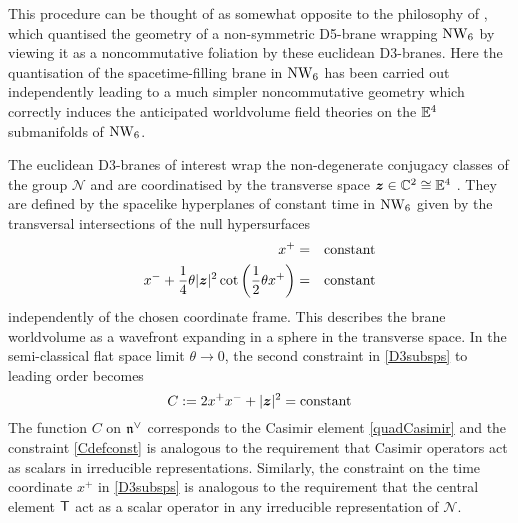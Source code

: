 This procedure can be thought of as somewhat opposite to the philosophy of
\cite{Halliday:2005zt}, which quantised the geometry of a non-symmetric D5-brane
wrapping $\operatorname{NW}_6$ \cite{KNSanjay1} by viewing it as a noncommutative foliation by
these euclidean D3-branes. Here the quantisation of the spacetime-filling brane
in $\operatorname{NW}_6$ has been carried out independently leading to a much simpler
noncommutative geometry which correctly induces the anticipated worldvolume
field theories on the ${\mathbb E}^4$ submanifolds of $\operatorname{NW}_6$.

The euclidean D3-branes of interest wrap the non-degenerate conjugacy classes of
the group $\mathcal{N}$ and are coordinatised by the transverse space
${{\boldsymbol {z} }}\in{\mathbb C}^2\cong{\mathbb E}^4$ \cite{SF1}. They are defined by the spacelike
hyperplanes of constant time in $\operatorname{NW}_6$ given by the transversal intersections
of the null hypersurfaces
\begin{eqnarray}
  \label{D3subsps}
  x^+&=&{\rm constant}\\
  x^-+ \frac14  \theta |{{\boldsymbol {z} }}|^2 \cot\left( \frac12  
    \theta x^+\right)&=&{\rm constant}\nonumber
\end{eqnarray}
independently of the chosen coordinate frame. This describes the brane
worldvolume as a wavefront expanding in a sphere in the transverse space. In the
semi-classical flat space limit $\theta\to0$, the second constraint in
\eqref{D3subsps} to leading order becomes
\begin{equation}
  \label{Cdefconst}
  C:=2 x^+ x^-+|{{\boldsymbol {z} }}|^2={\rm constant}
\end{equation}
The function $C$ on ${\mathfrak n}^\vee$ corresponds to the Casimir element
\eqref{quadCasimir} and the constraint \eqref{Cdefconst} is analogous to the
requirement that Casimir operators act as scalars in irreducible
representations. Similarly, the constraint on the time coordinate $x^+$ in
\eqref{D3subsps} is analogous to the requirement that the central element ${\sf T}$
act as a scalar operator in any irreducible representation of $\mathcal{N}$.

